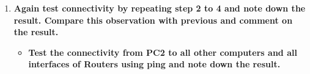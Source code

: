 \documentclass[a4paper,11pt]{article}
\begin{document}
\begin{enumerate}
    \item\textbf{ Again test connectivity by repeating step 2 to 4 and note down the result. Compare this observation with previous and comment on the result.}

          \begin{itemize}
              \item \textbf{Test the connectivity from PC2 to all other computers and all interfaces of Routers using ping
                        and note down the result.}


                    \begin{table}[H]
                        \centering


\end{table}
\end{itemize}
\end{enumerate}
\end{document}
